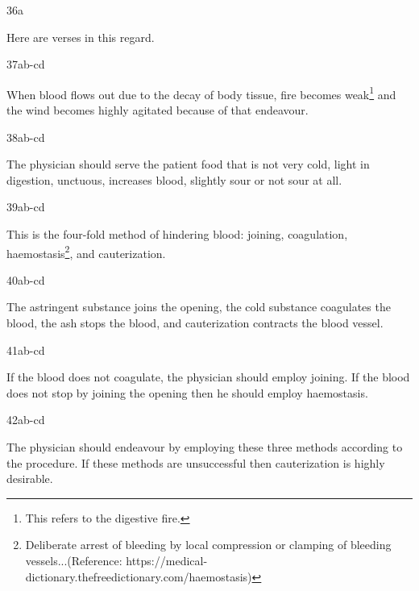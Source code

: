 \begin{translation}
\item[36a]

Here are verses in this regard.

\item[37ab-cd]

\begin{sloka}
When blood flows out due to the decay of body tissue, fire becomes weak\footnote{This refers to the digestive fire.} and the wind becomes highly agitated because of that endeavour.
\end{sloka}

\item[38ab-cd]

\begin{sloka}
The physician should serve the patient food that is not very cold, light in digestion, unctuous, increases blood, slightly sour or not sour at all. 
\end{sloka}

\item[39ab-cd]

\begin{sloka}
This is the four-fold method of hindering blood: joining, coagulation, 
haemostasis\footnote{Deliberate arrest of bleeding by local compression or 
clamping of bleeding vessels...(Reference: 
https://medical-dictionary.thefreedictionary.com/haemostasis)}, and cauterization.  
\end{sloka}

\item[40ab-cd]

\begin{sloka}
The astringent substance joins the opening, the cold substance coagulates the blood, the ash stops the blood, and cauterization contracts the blood vessel.
\end{sloka}

\item[41ab-cd]

\begin{sloka}
If the blood does not coagulate, the physician should employ joining. If the blood does not stop by joining the opening then he should employ haemostasis.
\end{sloka}

\item[42ab-cd]

\begin{sloka}
The physician should endeavour by employing these three methods according to the procedure. If these methods are unsuccessful then cauterization is highly desirable.
\end{sloka}


\end{translation}
